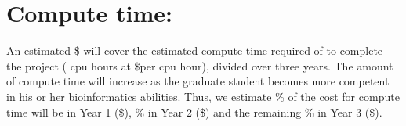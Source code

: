 \documentclass{article}
\begin{document}
\section{Compute time:}
An estimated \$\resultCSeqmCTrain \hspace{1 pt} will cover the estimated compute time required of to complete the project (\resultCCPUtime \hspace{1 pt} cpu hours at \$\CostCompute  per cpu hour), divided over three years.  The amount of compute time will increase as the graduate student becomes more competent in his or her bioinformatics abilities.   Thus, we estimate \percentComputeYrOne\% of the cost for compute time will be in Year 1 (\$\resultCostComputeYrOne), \percentComputeYrTwo\% in Year 2 (\$\resultCostComputeYrTwo) and the remaining \percentComputeYrThree\% in Year 3 (\$\resultCostComputeYrThree).

  
 
\end{document}
